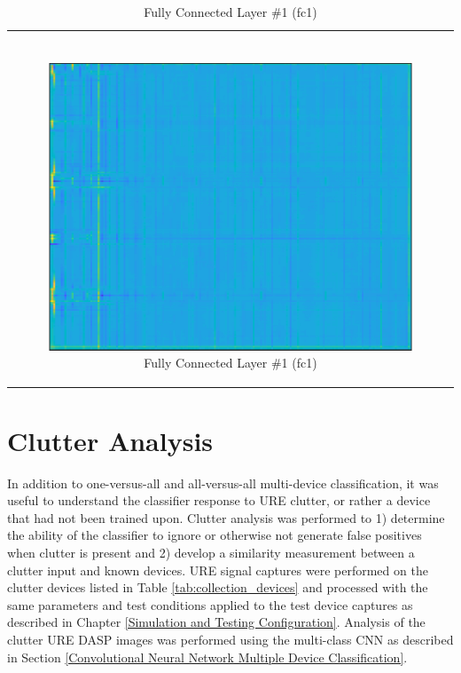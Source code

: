 {\begin{table}[tb]
\begin{tabular}{cc}
\begin{subfigure}{0.5\textwidth}
		\end{subfigure} \\
		\multicolumn{2}{c}{\begin{subfigure}{0.5\textwidth}\centering\includegraphics[width=0.9\columnwidth]{./dasp_algorithm_results/dasp_cnn_multi_nonermvd_dream_layers_9.eps}
		\caption{Fully Connected Layer \#1 (fc1)}\label{fig:cnnlayerfc1}
		\end{subfigure}}\\
	\end{tabular}
\label{tab:cnn_net_layers_masplscatter}
\end{table}
}

\section[Clutter Analysis]{Clutter Analysis}
\label{Clutter Analysis}

In addition to one-versus-all and all-versus-all multi-device classification, it was useful to understand the classifier response to URE clutter, or rather a device that had not been trained upon.  Clutter analysis was performed to 1) determine the ability of the classifier to ignore or otherwise not generate false positives when clutter is present and 2) develop a similarity measurement between a clutter input and known devices.  URE signal captures were performed on the clutter devices listed in Table \ref{tab:collection_devices} and processed with the same parameters and test conditions applied to the test device captures as described in Chapter \ref{Simulation and Testing Configuration}.  Analysis of the clutter URE DASP images was performed using the multi-class CNN as described in Section \ref{Convolutional Neural Network Multiple Device Classification}.  


